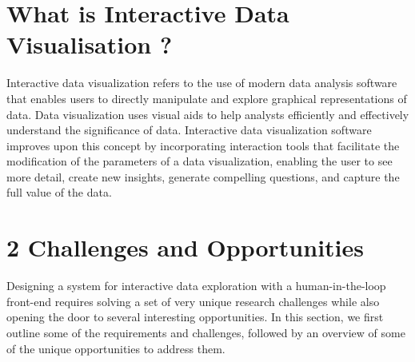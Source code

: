 \documentclass[12pt,letterpaper, onecolumn]{exam}
\begin{document}
    \section{What is Interactive Data Visualisation ?}
    Interactive data visualization refers to the use of modern data analysis software that enables users to directly manipulate and explore graphical representations of data. Data visualization uses visual aids to help analysts efficiently and effectively understand the significance of data. Interactive data visualization software improves upon this concept by incorporating interaction tools that facilitate the modification of the parameters of a data visualization, enabling the user to see more detail, create new insights, generate compelling questions, and capture the full value of the data.
    
    \section{2 Challenges and Opportunities}
    Designing a system for interactive data exploration with a human-in-the-loop front-end requires solving a set of very unique research challenges while also opening the door to several interesting opportunities. In this section, we first outline some of the requirements and challenges, followed by an overview of some of the unique opportunities to address them.
    
    
\end{document}
